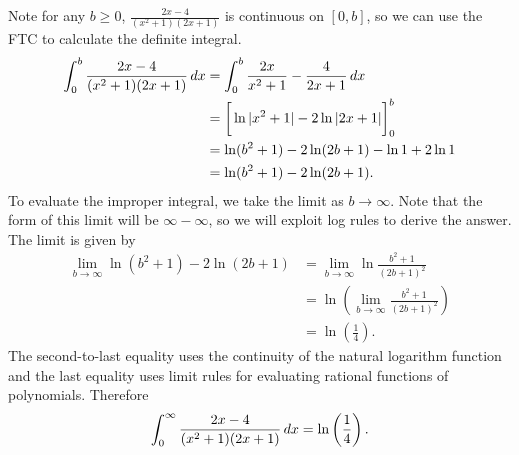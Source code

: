 \documentclass[handout]{ximera}
\begin{document}
\begin{freeResponse}
Note for any $b \geq 0$, $\frac{2x-4}{(x^2+1)(2x+1)} $ is continuous on $[0,b]$, so we can use the FTC to calculate the definite integral. 
\begin{align*}
\int_0^b \frac{2x-4}{(x^2+1)(2x+1)}  \mathop{}\!d x &= \int_0^b \frac{2x}{x^2+1} - \frac{4}{2x+1} \mathop{}\!d x \\
&= \bigg[ \ln |x^2+1| - 2\ln |2x+1| \bigg]_0^b \\
&= \ln (b^2+1) - 2 \ln (2b+1) - \ln 1 + 2 \ln 1 \\
&= \ln (b^2+1) - 2 \ln (2b+1).
\end{align*}
To evaluate the improper integral, we take the limit as $b\rightarrow \infty$. Note that the form of this limit will be $\infty - \infty$, so we will exploit log rules to derive the answer. The limit is given by
\begin{align*}
\lim_{b\rightarrow \infty} \ln (b^2+1) - 2 \ln (2b+1) &= \lim_{b\rightarrow \infty} \ln \frac{b^2+1}{(2b+1)^2} \\
&= \ln \left(\lim_{b\rightarrow \infty} \frac{b^2+1}{(2b+1)^2}\right) \\
&= \ln\left( \frac{1}{4}\right).
\end{align*}
The second-to-last equality uses the continuity of the natural logarithm function and the last equality uses limit rules for evaluating rational functions of polynomials. Therefore 
$$
\int_0^\infty \frac{2x-4}{(x^2+1)(2x+1)} \mathop{}\!d x = \ln\left( \frac{1}{4}\right).
$$
\end{freeResponse}
\end{document}
